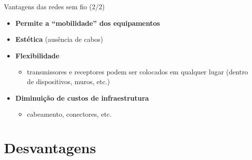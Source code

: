 \documentclass[aspectratio=169,11pt]{beamer}
\begin{document}
\begin{frame}{Vantagens das redes sem fio (2/2)}
  \begin{itemize}
    \item \textbf{Permite a ``mobilidade'' dos equipamentos}
    \item \textbf{Estética} (ausência de cabos)
    \item \textbf{Flexibilidade}
      \begin{itemize}
        \item transmissores e receptores podem ser colocados em qualquer lugar (dentro de dispositivos, muros, etc.)
      \end{itemize}
    \item \textbf{Diminuição de custos de infraestrutura}
      \begin{itemize}
        \item cabeamento, conectores, etc.
      \end{itemize}
  \end{itemize}
  \begin{center}
  \end{center}
\end{frame}

\section{Desvantagens}
\end{document}
